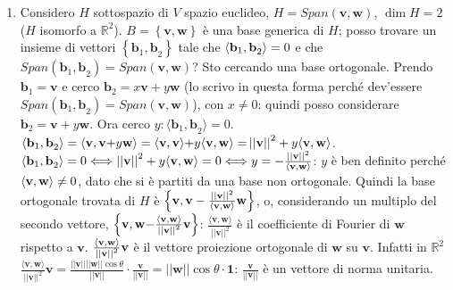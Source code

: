 \documentclass{article}
\begin{document}
\begin{enumerate}
\item Considero $H$ sottospazio di $V$ spazio euclideo, $H=Span\left( 
\mathbf{v,w}\right) $, $\dim H=2$ ($H$ isomorfo a $%
\mathbb{R}
^{2}$). $B=\left\{ \mathbf{v,w}\right\} $ \`{e} una base generica di $H$;
posso trovare un insieme di vettori $\left\{ \mathbf{b}_{1}\mathbf{,b}%
_{2}\right\} $ tale che $\langle \mathbf{b}_{1}\mathbf{,b}_{2}\mathbf{%
\rangle }=0$ e che $Span\left( \mathbf{b}_{1}\mathbf{,b}_{2}\right)
=Span\left( \mathbf{v,w}\right) $? Sto cercando una base ortogonale. Prendo $%
\mathbf{b}_{1}\mathbf{=v}$ e cerco $\mathbf{b}_{2}=x\mathbf{v}+y\mathbf{w}$
(lo scrivo in questa forma perch\'{e} dev'essere $Span\left( \mathbf{b}_{1}%
\mathbf{,b}_{2}\right) =Span\left( \mathbf{v,w}\right) $), con $x\neq 0$:
quindi posso considerare $\mathbf{b}_{2}=\mathbf{v}+y\mathbf{w}$. Ora cerco $%
y:\langle \mathbf{b}_{1}\mathbf{,b}_{2}\mathbf{\rangle }=0$. $\langle 
\mathbf{b}_{1}\mathbf{,b}_{2}\mathbf{\rangle }=\langle \mathbf{v,v+}y\mathbf{%
w\rangle }=\langle \mathbf{v,v\rangle +}y\langle \mathbf{v,w\rangle =}%
\left\vert \left\vert \mathbf{v}\right\vert \right\vert ^{2}+y\langle 
\mathbf{v,w\rangle }$. $\langle \mathbf{b}_{1}\mathbf{,b}_{2}\mathbf{\rangle 
}=0\Longleftrightarrow \left\vert \left\vert \mathbf{v}\right\vert
\right\vert ^{2}+y\langle \mathbf{v,w\rangle }=0\Longleftrightarrow y=-\frac{%
\left\vert \left\vert \mathbf{v}\right\vert \right\vert ^{2}}{\langle 
\mathbf{v,w\rangle }}$: $y$ \`{e} ben definito perch\'{e} $\langle \mathbf{%
v,w\rangle }\neq 0$, dato che si \`{e} partiti da una base non ortogonale.
Quindi la base ortogonale trovata di $H$ \`{e} $\left\{ \mathbf{v,v}-\frac{%
\left\vert \left\vert \mathbf{v}\right\vert \right\vert ^{2}}{\langle 
\mathbf{v,w\rangle }}\mathbf{w}\right\} $, o, considerando un multiplo del
secondo vettore, $\left\{ \mathbf{v,w-}\frac{\langle \mathbf{v,w\rangle }}{%
\left\vert \left\vert \mathbf{v}\right\vert \right\vert ^{2}}\mathbf{v}%
\right\} $: $\frac{\langle \mathbf{v,w\rangle }}{\left\vert \left\vert 
\mathbf{v}\right\vert \right\vert ^{2}}$ \`{e} il coefficiente di Fourier di 
$\mathbf{w}$ rispetto a $\mathbf{v}$. $\frac{\langle \mathbf{v,w\rangle }}{%
\left\vert \left\vert \mathbf{v}\right\vert \right\vert ^{2}}\mathbf{v}$ 
\`{e} il vettore proiezione ortogonale di $\mathbf{w}$ su $\mathbf{v}$.
Infatti in $%
\mathbb{R}
^{2}$ $\frac{\langle \mathbf{v,w\rangle }}{\left\vert \left\vert \mathbf{v}%
\right\vert \right\vert ^{2}}\mathbf{v=}\frac{\left\vert \left\vert \mathbf{v%
}\right\vert \right\vert \left\vert \left\vert \mathbf{w}\right\vert
\right\vert \cos \theta }{\left\vert \left\vert \mathbf{v}\right\vert
\right\vert }\cdot \frac{\mathbf{v}}{\left\vert \left\vert \mathbf{v}%
\right\vert \right\vert }=\left\vert \left\vert \mathbf{w}\right\vert
\right\vert \cos \theta \cdot \mathbf{1}$: $\frac{\mathbf{v}}{\left\vert
\left\vert \mathbf{v}\right\vert \right\vert }$ \`{e} un vettore di norma
unitaria.
\end{enumerate}
\end{document}
